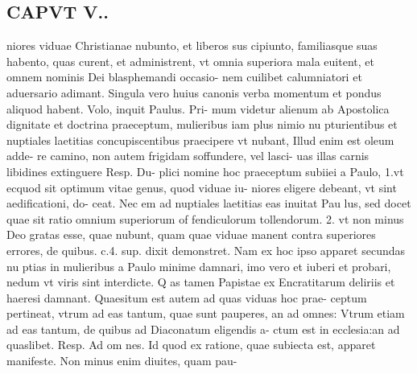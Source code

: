 \documentclass{article}
\begin{document}
\begin{pages}
\section*{CAPVT  V.. }
\marginpar{[ p.29 ]}\pstart niores viduae Christianae nubunto, et liberos sus cipiunto, familiasque suas habento, quas curent, et administrent, vt omnia superiora mala euitent, et omnem nominis Dei blasphemandi occasio- nem cuilibet calumniatori et aduersario adimant. Singula vero huius canonis verba momentum et pondus aliquod habent. Volo, inquit Paulus. Pri- mum videtur alienum ab Apostolica dignitate et doctrina praeceptum, mulieribus iam plus nimio nu pturientibus et nuptiales laetitias concupiscentibus praecipere vt nubant, Illud enim est oleum adde- re camino, non autem frigidam soffundere, vel lasci- uas illas carnis libidines extinguere Resp. Du- plici nomine hoc praeceptum subiiei a Paulo, 1.vt ecquod sit optimum vitae genus, quod viduae iu- niores eligere debeant, vt sint aedificationi, do- ceat. Nec em ad nuptiales laetitias eas inuitat Pau lus, sed docet quae sit ratio omnium superiorum of fendiculorum tollendorum. 2. vt non minus Deo gratas esse, quae nubunt, quam quae viduae manent contra superiores errores, de quibus. c.4. sup. dixit demonstret. Nam ex hoc ipso apparet secundas nu ptias in mulieribus a Paulo minime damnari, imo vero et iuberi et probari, nedum vt viris sint interdicte. Q as tamen Papistae ex Encratitarum deliriis et haeresi damnant. Quaesitum est autem ad quas viduas hoc prae- ceptum pertineat, vtrum ad eas tantum, quae sunt pauperes, an ad omnes: Vtrum etiam ad eas tantum, de quibus ad Diaconatum eligendis a- ctum est in ecclesia:an ad quaslibet. Resp. Ad om nes. Id quod ex ratione, quae subiecta est, apparet manifeste. Non minus enim diuites, quam pau-  \pend

\end{pages}
\end{document}

